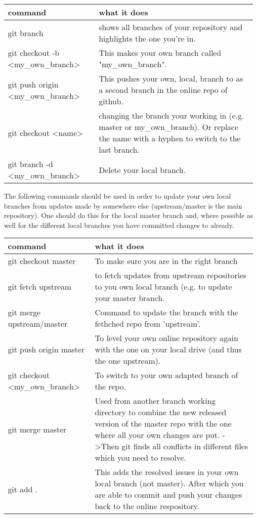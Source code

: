 \begin{center}
\begin{tabular}{p{6cm}|p{9cm}}
\textbf{command} &  \textbf{what it does} \\
\hline
  git branch & shows all branches of your repository and highlights the one you're in. \\
  git checkout -b \textless my\_own\_branch\textgreater & This makes your own branch called "my\_own\_branch". \\
  git push origin \textless my\_own\_branch\textgreater & This pushes your own, local, branch to as a second branch in the online repo of github. \\
  git checkout \textless name\textgreater & changing the branch your working in (e.g. master or my\_own\_branch). Or replace the name with a hyphen to switch to the last branch.\\
  git branch -d \textless my\_own\_branch\textgreater & Delete your local branch. \\
  \end{tabular}
\end{center}

  The following commands should be used in order to update your own local branches from updates made by somewhere else (upstream/master is the main repository). One should do this for the local master branch and, where possible as well for the different local branches you have committed changes to already. 

  
\begin{center}
\begin{tabular}{p{6cm}|p{9cm}}
\textbf{command} &  \textbf{what it does} \\
\hline
git checkout master & To make sure you are in the right branch \\
  git fetch upstream & to fetch updates from upstream repositories to you own local branch (e.g. to update your master branch. \\
  git merge upstream/master & Command to update the branch with the fethched repo from 'upstream'. \\
  git push origin master & To level your own online repository again with the one on your local drive (and thus the one upstream). \\
  git checkout \textless my\_own\_branch\textgreater & To switch to your own adapted branch of the repo. \\
  git merge master & Used from another branch working directory to combine the new released version of the master repo with the one where all your own changes are put. -\textgreater Then git finds all conflicts in different files which you need to resolve. \\
  git add . & This adds the resolved issues in your own local branch (not master). After which you are able to commit and push your changes back to the online respository. 
\end{tabular}
\end{center}


